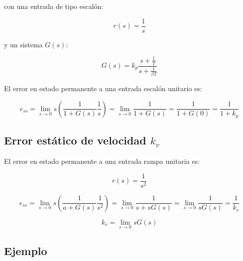             con una entrada de tipo escalón:

            \begin{equation*}
                r(s) = \frac{1}{s}
            \end{equation*}

            y un sistema $G(s)$:

            \begin{equation*}
                G(s) = k_p \frac{s + \frac{1}{T}}{s + \frac{1}{\beta T}}
            \end{equation*}

            El error en estado permanente a una entrada escalón unitario es:

            \begin{equation*}
                e_{ss} = \lim_{s \to 0} s \left( \frac{1}{1 + G(s)} \frac{1}{s} \right) = \lim_{s \to 0} \frac{1}{1 + G(s)} = \frac{1}{1 + G(0)} = \frac{1}{1 + k_p}
            \end{equation*}



        \subsection{Error estático de velocidad $k_v$}
            El error en estado permanente a una entrada rampa unitaria es:

            \begin{equation*}
                r(s) = \frac{1}{s^2}
            \end{equation*}

            \begin{equation*}
                e_{ss} = \lim_{s \to 0} s \left( \frac{1}{a + G(s)} \frac{1}{s^2} \right) = \lim_{s \to 0} \frac{1}{s + s G(s)} = \lim_{s \to 0} \frac{1}{s G(s)} = \frac{1}{k_v}
            \end{equation*}

            \begin{equation*}
                k_v = \lim_{s \to 0} s G(s)
            \end{equation*}



        \subsection{Ejemplo}

